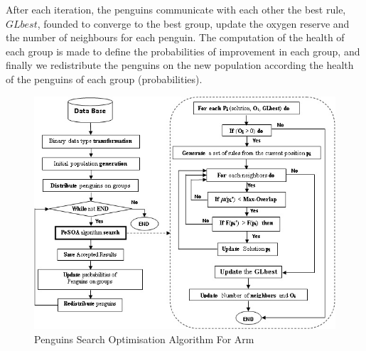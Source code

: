\documentclass[preprint,12pt]{elsarticle}
\begin{document}
 After each iteration, the penguins communicate with each other the best rule,  $GLbest$, founded  to converge to the best group, update the oxygen reserve and the number of neighbours  for each penguin. The computation of the health of each group is made to  define the probabilities of improvement in each group, and finally we redistribute the penguins on the new population according the health of the penguins of each group (probabilities). 
\begin{figure}[htbp]
\begin{center}
\includegraphics[width=15cm]{2.jpg}
\end{center}
\caption{Penguins Search Optimisation Algorithm For Arm}
\label{algo}
\end{figure}
\end{document}
